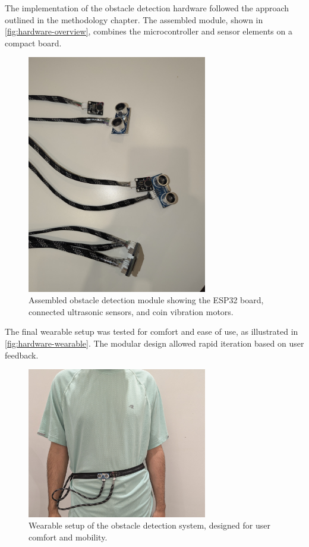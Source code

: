 The implementation of the obstacle detection hardware followed the approach outlined in the methodology chapter. The assembled module, shown in \autoref{fig:hardware-overview}, combines the microcontroller and sensor elements on a compact board.
\begin{figure}[h]
	\centering
	\includegraphics[width=0.7\textwidth]{assets/ch5_imp/obstacle_detection.jpg}
	\caption{Assembled obstacle detection module showing the ESP32 board, connected ultrasonic sensors, and coin vibration motors.}
	\label{fig:hardware-overview}
\end{figure}

The final wearable setup was tested for comfort and ease of use, as illustrated in \autoref{fig:hardware-wearable}. The modular design allowed rapid iteration based on user feedback.
\begin{figure}[h]
	\centering
	\includegraphics[width=0.7\textwidth]{assets/ch5_imp/obstac_weared.jpg}
	\caption{Wearable setup of the obstacle detection system, designed for user comfort and mobility.}
	\label{fig:hardware-wearable}
\end{figure}

